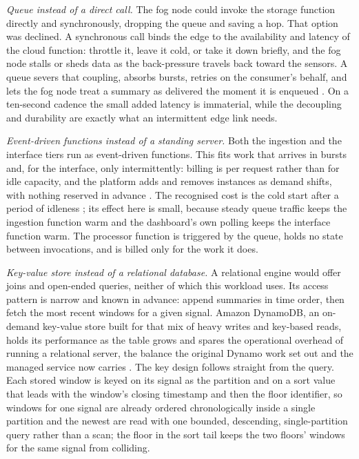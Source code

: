 \documentclass[conference]{IEEEtran}
\begin{document}
\textit{Queue instead of a direct call.} The fog node could invoke the storage function directly and synchronously, dropping the queue and saving a hop. That option was declined. A synchronous call binds the edge to the availability and latency of the cloud function: throttle it, leave it cold, or take it down briefly, and the fog node stalls or sheds data as the back-pressure travels back toward the sensors. A queue severs that coupling, absorbs bursts, retries on the consumer's behalf, and lets the fog node treat a summary as delivered the moment it is enqueued \cite{hohpe2003}. On a ten-second cadence the small added latency is immaterial, while the decoupling and durability are exactly what an intermittent edge link needs.

\textit{Event-driven functions instead of a standing server.} Both the ingestion and the interface tiers run as event-driven functions. This fits work that arrives in bursts and, for the interface, only intermittently: billing is per request rather than for idle capacity, and the platform adds and removes instances as demand shifts, with nothing reserved in advance \cite{armbrust2010}. The recognised cost is the cold start after a period of idleness \cite{wang2018}; its effect here is small, because steady queue traffic keeps the ingestion function warm and the dashboard's own polling keeps the interface function warm. The processor function is triggered by the queue, holds no state between invocations, and is billed only for the work it does.

\textit{Key-value store instead of a relational database.} A relational engine would offer joins and open-ended queries, neither of which this workload uses. Its access pattern is narrow and known in advance: append summaries in time order, then fetch the most recent windows for a given signal. Amazon DynamoDB, an on-demand key-value store built for that mix of heavy writes and key-based reads, holds its performance as the table grows and spares the operational overhead of running a relational server, the balance the original Dynamo work set out and the managed service now carries \cite{decandia2007, elhemali2022}. The key design follows straight from the query. Each stored window is keyed on its signal as the partition and on a sort value that leads with the window's closing timestamp and then the floor identifier, so windows for one signal are already ordered chronologically inside a single partition and the newest are read with one bounded, descending, single-partition query rather than a scan; the floor in the sort tail keeps the two floors' windows for the same signal from colliding.
\end{document}
